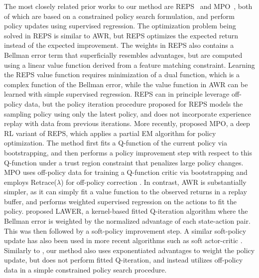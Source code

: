 The most closely related prior works to our method are REPS~\citep{Peters2010REP} and MPO~\citep{abdolmaleki2018maximum}, both of which are based on a constrained policy search formulation, and perform policy updates using supervised regression. The optimization problem being solved in REPS is similar to AWR, but REPS optimizes the expected return instead of the expected improvement. The weights in REPS also contains a Bellman error term that superficially resembles advantages, but are computed using a linear value function derived from a feature matching constraint. Learning the REPS value function requires minimization of a dual function, which is a complex function of the Bellman error, while the value function in AWR can be learned with simple supervised regression. REPS can in principle leverage off-policy data, but the policy iteration procedure proposed for REPS models the sampling policy using only the latest policy, and does not incorporate experience replay with data from previous iterations. More recently, \citet{abdolmaleki2018maximum} proposed MPO, a deep RL variant of REPS, which applies a partial EM algorithm for policy optimization. The method first fits a Q-function of the current policy via bootstrapping, and then performs a policy improvement step with respect to this Q-function under a trust region constraint that penalizes large policy changes. MPO uses off-policy data for training a Q-function critic via bootstrapping and employs Retrace($\lambda$) for off-policy correction \citep{Munos2016}. In contrast, AWR is substantially simpler, as it can simply fit a value function to the observed returns in a replay buffer, and performs weighted supervised regression on the actions to fit the policy.
\citet{Neumann2009Gerhard} proposed LAWER, a kernel-based fitted Q-iteration algorithm where the Bellman error is weighted by the normalized advantage of each state-action pair. This was then followed by a soft-policy improvement step. A similar soft-policy update has also been used in more recent algorithms such as soft actor-critic \citep{haarnoja18b}. Similarly to \citep{Neumann2009Gerhard}, our method also uses exponentiated advantages to weight the policy update, but does not perform fitted Q-iteration, and instead utilizes off-policy data in a simple constrained policy search procedure.

